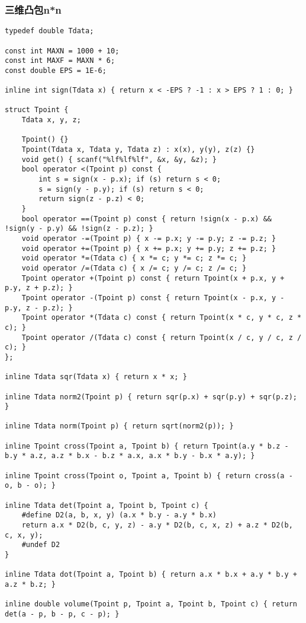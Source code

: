 \subsubsection{三维凸包n*n}
\begin{verbatim}
typedef double Tdata;

const int MAXN = 1000 + 10;
const int MAXF = MAXN * 6;
const double EPS = 1E-6;

inline int sign(Tdata x) { return x < -EPS ? -1 : x > EPS ? 1 : 0; }

struct Tpoint {
    Tdata x, y, z;
    
    Tpoint() {}
    Tpoint(Tdata x, Tdata y, Tdata z) : x(x), y(y), z(z) {}
    void get() { scanf("%lf%lf%lf", &x, &y, &z); }
    bool operator <(Tpoint p) const {
        int s = sign(x - p.x); if (s) return s < 0;
        s = sign(y - p.y); if (s) return s < 0;
        return sign(z - p.z) < 0;
    }
    bool operator ==(Tpoint p) const { return !sign(x - p.x) && !sign(y - p.y) && !sign(z - p.z); }
    void operator -=(Tpoint p) { x -= p.x; y -= p.y; z -= p.z; }
    void operator +=(Tpoint p) { x += p.x; y += p.y; z += p.z; }
    void operator *=(Tdata c) { x *= c; y *= c; z *= c; }
    void operator /=(Tdata c) { x /= c; y /= c; z /= c; }
    Tpoint operator +(Tpoint p) const { return Tpoint(x + p.x, y + p.y, z + p.z); }
    Tpoint operator -(Tpoint p) const { return Tpoint(x - p.x, y - p.y, z - p.z); }
    Tpoint operator *(Tdata c) const { return Tpoint(x * c, y * c, z * c); }
    Tpoint operator /(Tdata c) const { return Tpoint(x / c, y / c, z / c); }
};

inline Tdata sqr(Tdata x) { return x * x; }

inline Tdata norm2(Tpoint p) { return sqr(p.x) + sqr(p.y) + sqr(p.z); }

inline Tdata norm(Tpoint p) { return sqrt(norm2(p)); }

inline Tpoint cross(Tpoint a, Tpoint b) { return Tpoint(a.y * b.z - b.y * a.z, a.z * b.x - b.z * a.x, a.x * b.y - b.x * a.y); }

inline Tpoint cross(Tpoint o, Tpoint a, Tpoint b) { return cross(a - o, b - o); }

inline Tdata det(Tpoint a, Tpoint b, Tpoint c) {
    #define D2(a, b, x, y) (a.x * b.y - a.y * b.x)
    return a.x * D2(b, c, y, z) - a.y * D2(b, c, x, z) + a.z * D2(b, c, x, y);
    #undef D2
}

inline Tdata dot(Tpoint a, Tpoint b) { return a.x * b.x + a.y * b.y + a.z * b.z; }

inline double volume(Tpoint p, Tpoint a, Tpoint b, Tpoint c) { return det(a - p, b - p, c - p); }


\end{verbatim}
